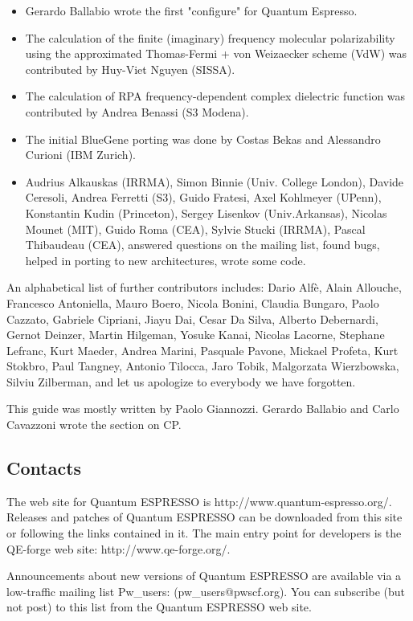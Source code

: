 \documentclass[12pt,a4paper]{article}
\begin{document}
\begin{itemize}
  \item Gerardo Ballabio wrote the first "configure" for Quantum Espresso.
  \item The calculation of the finite (imaginary) frequency molecular
polarizability using the approximated Thomas-Fermi  + von Weizaecker
scheme (VdW) was contributed by Huy-Viet Nguyen (SISSA).
  \item The calculation of RPA frequency-dependent complex dielectric
function was contributed by Andrea Benassi (S3 Modena).
  \item The initial BlueGene porting was done by Costas Bekas and
Alessandro Curioni (IBM Zurich).
  \item Audrius Alkauskas (IRRMA), 
Simon Binnie (Univ. College London), Davide Ceresoli,
Andrea Ferretti (S3), Guido Fratesi, Axel Kohlmeyer (UPenn),
Konstantin Kudin (Princeton), Sergey Lisenkov (Univ.Arkansas), 
Nicolas Mounet (MIT), Guido Roma (CEA), Sylvie Stucki (IRRMA),
Pascal Thibaudeau (CEA), 
answered questions on the mailing list, found bugs, helped in 
porting to new architectures, wrote some code.
\end{itemize}

An alphabetical list of further contributors includes: Dario Alf\`e, 
Alain Allouche, 
Francesco Antoniella, Mauro Boero, Nicola Bonini, Claudia Bungaro, 
Paolo Cazzato, Gabriele Cipriani, Jiayu Dai, Cesar Da Silva, 
Alberto Debernardi, Gernot Deinzer, 
Martin Hilgeman,  Yosuke Kanai, Nicolas Lacorne, Stephane Lefranc,
Kurt Maeder, Andrea Marini, 
Pasquale Pavone,  Mickael Profeta, Kurt Stokbro, 
Paul Tangney, 
Antonio Tilocca, Jaro Tobik, 
Malgorzata Wierzbowska, Silviu Zilberman, 
and let us apologize to everybody we have forgotten.
    
This guide was mostly written by Paolo Giannozzi.
Gerardo Ballabio and Carlo Cavazzoni wrote the section on CP.

\subsection{Contacts}

The web site for Quantum ESPRESSO is http://www.quantum-espresso.org/.
Releases and patches of Quantum ESPRESSO can be downloaded from this
site or following the links contained in it. The main entry point for 
developers is the QE-forge web site: http://www.qe-forge.org/.

Announcements about new versions of Quantum ESPRESSO are available 
via a low-traffic mailing list Pw\_users: (pw\_users@pwscf.org). You can
subscribe (but not post) to this list from the Quantum ESPRESSO web site.
    
\end{document}
